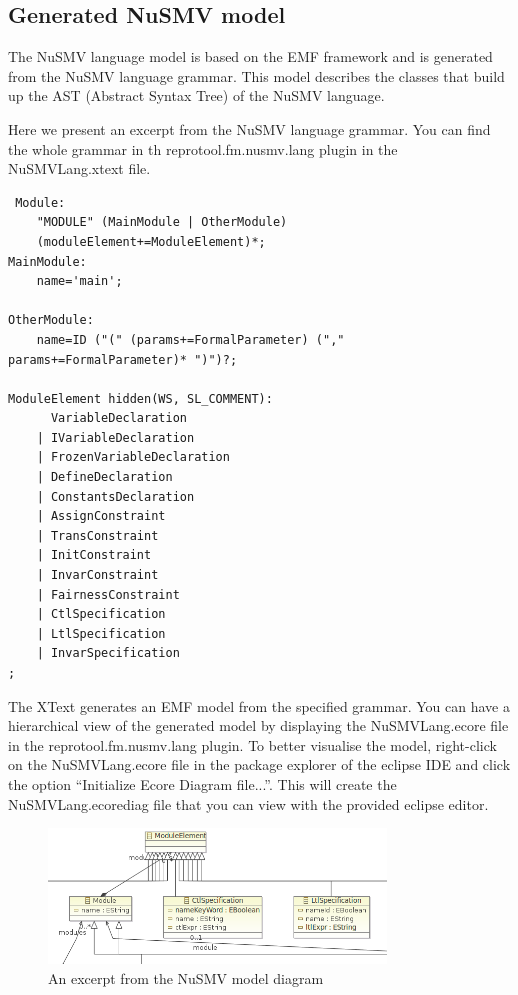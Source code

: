 \subsection{Generated NuSMV model}

The NuSMV language model is based on the EMF framework and is generated from the NuSMV language grammar.
This model describes the classes that build up the AST (Abstract Syntax Tree) of the NuSMV language.

Here we present an excerpt from the NuSMV language grammar. You can find the whole grammar in th
reprotool.fm.nusmv.lang plugin in the NuSMVLang.xtext file.

\begin{lstlisting}
 Module:
	"MODULE" (MainModule | OtherModule)
	(moduleElement+=ModuleElement)*;
MainModule:
	name='main';

OtherModule:
	name=ID ("(" (params+=FormalParameter) ("," params+=FormalParameter)* ")")?;

ModuleElement hidden(WS, SL_COMMENT):
	  VariableDeclaration
	| IVariableDeclaration
	| FrozenVariableDeclaration
	| DefineDeclaration
	| ConstantsDeclaration
	| AssignConstraint
	| TransConstraint
	| InitConstraint
	| InvarConstraint
	| FairnessConstraint
	| CtlSpecification
	| LtlSpecification
	| InvarSpecification
;
\end{lstlisting}

The XText generates an EMF model from the specified grammar. You can have a hierarchical view of the generated model by displaying the
NuSMVLang.ecore file in the reprotool.fm.nusmv.lang plugin. To better visualise the model, right-click on the NuSMVLang.ecore file in
the package explorer of the eclipse IDE and click the option ``Initialize Ecore Diagram file...''. This will create the
NuSMVLang.ecorediag file that you can view with the provided eclipse editor.

\begin{figure}[h]
  \centering
  \includegraphics[width=0.8\textwidth]{images/NuSmvLang}
  \caption{An excerpt from the NuSMV model diagram}
  \label{fig:XtextWorkflow}
\end{figure}

